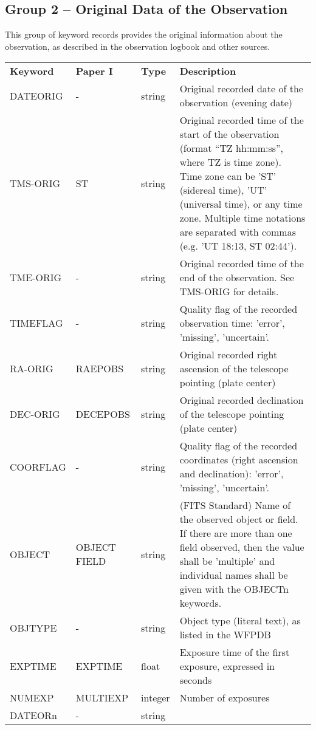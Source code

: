 \documentclass[11pt]{ivoa}
\begin{document}
\subsection{Group 2 -- Original Data of the Observation}

This group of keyword records provides the original information about
the observation, as described in the observation logbook and other
sources.

\begingroup
\footnotesize
\begin{longtable}{lllp{}}
\sptablerule
\textbf{Keyword}&\textbf{Paper
I}&\textbf{Type}&\textbf{Description}\\
\sptablerule
\endhead
DATEORIG  &-        &string  &
  Original recorded date of the observation (evening date)\\
TMS-ORIG  &ST       &string  &
  Original recorded time of the start of the observation (format ``TZ
  hh:mm:ss'', where TZ is time zone). Time zone can be 'ST' (sidereal
  time), 'UT' (universal time), or any time zone.  Multiple time
  notations are separated with commas (e.g. 'UT 18:13, ST 02:44').\\
TME-ORIG  &-        &string  &
  Original recorded time of the end of the observation. See TMS-ORIG for details.\\
TIMEFLAG  &-        &string  &
  Quality flag of the recorded observation time: 'error', 'missing', 'uncertain'.\\
RA-ORIG   &RAEPOBS  &string  &
  Original recorded right ascension of the telescope pointing (plate center)\\
DEC-ORIG  &DECEPOBS &string  &
  Original recorded declination of the telescope pointing (plate center)\\
COORFLAG  &-        &string  &
  Quality flag of the recorded coordinates (right ascension and
  declination): 'error', 'missing', 'uncertain'.\\
OBJECT    &OBJECT FIELD &string &
  (FITS Standard) Name of the observed object or field. If there are
  more than one field observed, then the value shall be 'multiple' and
  individual names shall be given with the OBJECTn keywords.\\
OBJTYPE   &-        &string  &
  Object type (literal text), as listed in the WFPDB\\
EXPTIME   &EXPTIME  &float   &
  Exposure time of the first exposure, expressed in seconds\\
NUMEXP    &MULTIEXP &integer &Number of exposures\\
DATEORn   &-        &string  &

\end{longtable}
\end{document}
